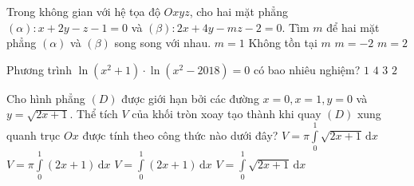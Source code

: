 \begin{ex}%
	Trong không gian với hệ tọa độ $Oxyz$, cho hai mặt phẳng $\left(\alpha \right)\colon  x+2y-z-1=0$ và $\left(\beta \right)\colon  2x+4y-mz-2=0$. Tìm $m$ để hai mặt phẳng $\left(\alpha \right)$ và $\left(\beta \right)$ song song với nhau.
	\choice
	{$m=1$}
	{\True Không tồn tại $m$}
	{$m=-2$}
	{$m=2$}
	\end{ex}
\begin{ex}%
	Phương trình $\ln \left(x^2+1\right)\cdot \ln \left(x^2-2018\right)=0$ có bao nhiêu nghiệm?
	\choice
	{$1$}
	{$4$}
	{$3$}
	{\True $2$}
\end{ex}
\begin{ex}%
	Cho hình phẳng $(D)$ được giới hạn bởi các đường $x=0, x=1, y=0$ và $y=\sqrt{{2x+1}}$. Thể tích $V$ của khối tròn xoay tạo thành khi quay $(D)$ xung quanh trục $Ox$ được tính theo công thức nào dưới đây?
	\choice
	{$V=\pi \displaystyle\int\limits_0^1 {\sqrt{2x+1}\mathrm{\,d}x}$}
	{\True $V=\pi \displaystyle\int\limits_0^1 {\left(2x+1\right)\mathrm{\,d}x}$}
	{$V=\displaystyle\int\limits_0^1 {\left(2x+1\right)\mathrm{\,d}x}$}
	{$V=\displaystyle\int\limits_0^1 {\sqrt{2x+1}\mathrm{\,d}x}$}
\end{ex}
